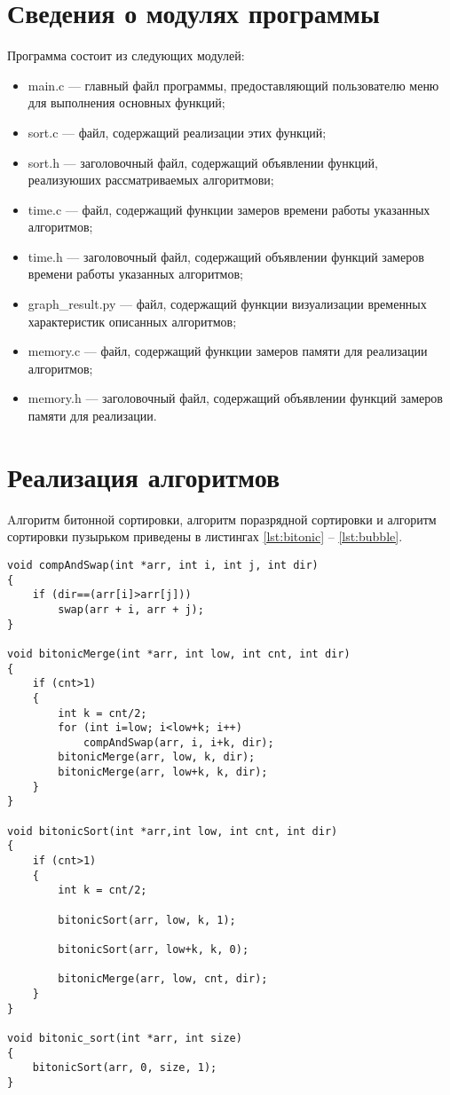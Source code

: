 \section{Сведения о модулях программы}

Программа состоит из следующих модулей:

\begin{itemize}
	\item main.c --- главный файл программы, предоставляющий пользователю меню для выполнения основных функций;
	\item sort.c --- файл, содержащий реализации этих функций;
	\item sort.h --- заголовочный файл, содержащий объявлении функций, реализуюших рассматриваемых алгоритмови;
	\item time.c --- файл, содержащий функции замеров времени работы указанных алгоритмов;
	\item time.h --- заголовочный файл, содержащий объявлении функций замеров времени работы указанных алгоритмов;
	\item graph\_result.py --- файл, содержащий функции визуализации временных характеристик описанных алгоритмов;
	\item memory.c --- файл, содержащий функции замеров памяти для реализации алгоритмов;
	\item memory.h --- заголовочный файл, содержащий объявлении функций замеров памяти для реализации.
\end{itemize}

\section{Реализация алгоритмов}

Aлгоритм битонной сортировки, алгоритм поразрядной сортировки и алгоритм сортировки пузырьком приведены в листингах \ref{lst:bitonic} -- \ref{lst:bubble}.


\begin{center}
\captionsetup{justification=raggedright,singlelinecheck=off}
\begin{lstlisting}[label=lst:bitonic,caption=Aлгоритм битонной сортировки]
void compAndSwap(int *arr, int i, int j, int dir)
{
	if (dir==(arr[i]>arr[j]))
		swap(arr + i, arr + j);
}

void bitonicMerge(int *arr, int low, int cnt, int dir)
{
	if (cnt>1)
	{
		int k = cnt/2;
		for (int i=low; i<low+k; i++)
			compAndSwap(arr, i, i+k, dir);
		bitonicMerge(arr, low, k, dir);
		bitonicMerge(arr, low+k, k, dir);
	}
}

void bitonicSort(int *arr,int low, int cnt, int dir)
{
	if (cnt>1)
	{
		int k = cnt/2;
		
		bitonicSort(arr, low, k, 1);
		
		bitonicSort(arr, low+k, k, 0);
		
		bitonicMerge(arr, low, cnt, dir);
	}
}

void bitonic_sort(int *arr, int size)
{
	bitonicSort(arr, 0, size, 1);
}
\end{lstlisting}
\end{center}
\clearpage


